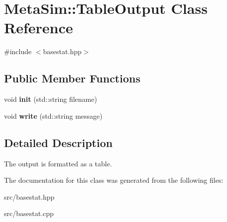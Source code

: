 \hypertarget{classMetaSim_1_1TableOutput}{}\section{Meta\+Sim\+:\+:Table\+Output Class Reference}
\label{classMetaSim_1_1TableOutput}


{\ttfamily \#include $<$basestat.\+hpp$>$}

\subsection*{Public Member Functions}
\begin{DoxyCompactItemize}
\item 
void {\bfseries init} (std\+::string filename)
\item 
void {\bfseries write} (std\+::string message)
\end{DoxyCompactItemize}


\subsection{Detailed Description}
The output is formatted as a table. 

The documentation for this class was generated from the following files\+:\begin{DoxyCompactItemize}
\item 
src/basestat.\+hpp\item 
src/basestat.\+cpp\end{DoxyCompactItemize}
